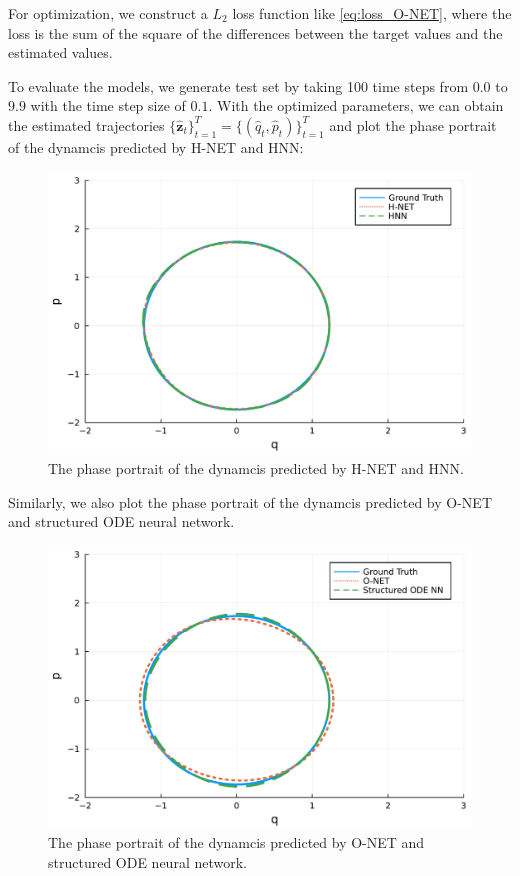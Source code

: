 \documentclass[
	parskip, 			   %
	twoside, 			   %
	DIV=14, 			   %
	BCOR=15.0mm, 		   %
	headsepline, 		   %
	open=right, 		   %
	captions=tableheading, %
	bibliography=totoc,    %
	numbers=noenddot       %
]{scrreprt}
\begin{document}
For optimization, we construct a $L_{2}$ loss function like \ref{eq:loss_O-NET}, where the loss is the sum of the square of the differences between the target values and the estimated values.

To evaluate the models, we generate test set by taking 100 time steps from $0.0$ to $9.9$ with the time step size of $0.1$. With the optimized parameters, we can obtain the estimated trajectories $\{ \mathbf{\hat{z}}_{t} \}_{t=1}^{T} = \{ (\hat{q}_{t}, \hat{p}_{t}) \}_{t=1}^{T}$ and plot the phase portrait of the dynamcis predicted by H-NET and HNN:

\begin{figure}[h!]
    \centering
    \includegraphics[scale=0.5]{figures/phase_portrait_H_NET_and_HNN.pdf}
    \caption{The phase portrait of the dynamcis predicted by H-NET and HNN.}
    \label{fig:phase_portrait_H_NET_and_HNN}
\end{figure}

Similarly, we also plot the phase portrait of the dynamcis predicted by O-NET and structured ODE neural network.

\begin{figure}[h!]
    \centering
    \includegraphics[scale=0.5]{figures/phase_portrait_O_NET_and_structured_ODE_NN.pdf}
    \caption{The phase portrait of the dynamcis predicted by O-NET and structured ODE neural network.}
    \label{fig:phase_portrait_O_NET_and_structured_ODE_NN}
\end{figure}
\end{document}
